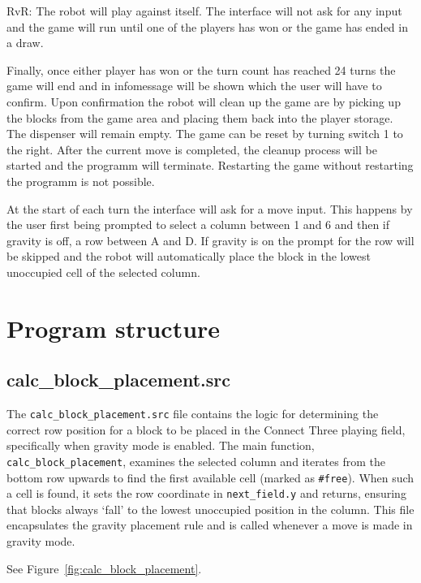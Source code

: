 \documentclass{article}
\begin{document}
        RvR\@: The robot will play against itself. The interface will not ask for any input and the game will run until one of the players has won or the game has ended in a draw.

        Finally, once either player has won or the turn count has reached 24 turns the game will end and in infomessage will be shown which the user will have to confirm. Upon confirmation the robot will clean up the game are by picking up the blocks from the game area and placing them back into the player storage. The dispenser will remain empty.
        The game can be reset by turning switch 1 to the right. After the current move is completed, the cleanup process will be started and the programm will terminate. Restarting the game without restarting the programm is not possible.

        At the start of each turn the interface will ask for a move input. This happens by the user first being prompted to select a column between 1 and 6 and then if gravity is off, a row between A and D. If gravity is on the prompt for the row will be skipped and the robot will automatically place the block in the lowest unoccupied cell of the selected column.
        \newpage

    \section{Program structure}
        \subsection{calc\_block\_placement.src}
            The \texttt{calc\_block\_placement.src} file contains the logic for determining the correct row position for a block to be placed in the Connect Three playing field, specifically when gravity mode is enabled. The main function, \texttt{calc\_block\_placement}, examines the selected column and iterates from the bottom row upwards to find the first available cell (marked as \texttt{\#free}). When such a cell is found, it sets the row coordinate in \texttt{next\_field.y} and returns, ensuring that blocks always `fall' to the lowest unoccupied position in the column. This file encapsulates the gravity placement rule and is called whenever a move is made in gravity mode.

            See Figure~\ref{fig:calc_block_placement}.
\end{document}
